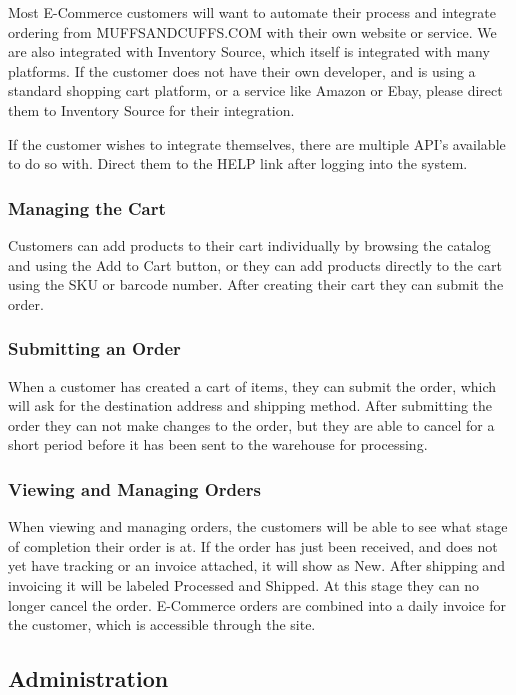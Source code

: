 Most E-Commerce customers will want to automate their process and integrate ordering from MUFFSANDCUFFS.COM with their own website or service.  We are also integrated with Inventory Source, which itself is integrated with many platforms.  If the customer does not have their own developer, and is using a standard shopping cart platform, or a service like Amazon or Ebay, please direct them to Inventory Source for their integration.

If the customer wishes to integrate themselves, there are multiple API's available to do so with.  Direct them to the HELP link after logging into the system.

\subsubsection{Managing the Cart}

Customers can add products to their cart individually by browsing the catalog and using the Add to Cart button, or they can add products directly to the cart using the SKU or barcode number.  After creating their cart they can submit the order.

\subsubsection{Submitting an Order}

When a customer has created a cart of items, they can submit the order, which will ask for the destination address and shipping method.  After submitting the order they can not make changes to the order, but they are able to cancel for a short period before it has been sent to the warehouse for processing.

\subsubsection{Viewing and Managing Orders}

When viewing and managing orders, the customers will be able to see what stage of completion their order is at.  If the order has just been received, and does not yet have tracking or an invoice attached, it will show as New.  After shipping and invoicing it will be labeled Processed and Shipped.  At this stage they can no longer cancel the order.  E-Commerce orders are combined into a daily invoice for the customer, which is accessible through the site.

\subsection{Administration}

